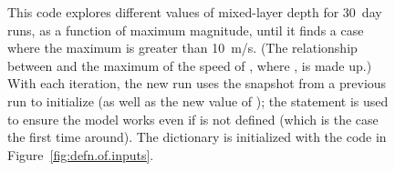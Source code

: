 \begin{latexonly}
\begin{figure}[p]
\caption{This code explores different values of
	mixed-layer depth  for 30~day runs,
	as a function of maximum  magnitude,
	until it finds a case where the maximum  is
	greater than 10~m/s.  (The relationship between
	 and the maximum of the speed of
	, where 
	, 
	is made up.)
	With each iteration, the new run uses the snapshot from
	a previous run to initialize (as well as the new value
	of ); the  statement is used to
	ensure the model works even if  is not
	defined (which is the case the first time around).
	The  dictionary is initialized with the code in
	Figure~\ref{fig:defn.of.inputs}.}
\label{fig:conditional.test.eg}
\end{figure}
\end{latexonly}

